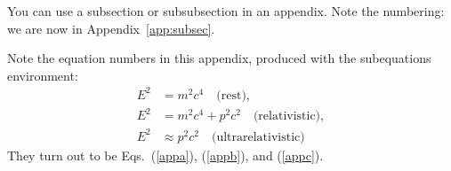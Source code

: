 \documentclass[]{article}
\begin{document}
You can use a subsection or subsubsection in an appendix. Note the numbering: we are now in Appendix~\ref{app:subsec}.

Note the equation numbers in this appendix, produced with the subequations environment:
\begin{subequations}
\begin{align}
  E^2 &= m^2c^4 \quad \text{(rest)}, \label{appa} \\
  E^2 &= m^2c^4 + p^2 c^2 \quad \text{(relativistic)}, \label{appb} \\
  E^2 &\approx p^2 c^2 \quad \text{(ultrarelativistic)} \label{appc}
\end{align}
\end{subequations}
They turn out to be Eqs.~(\ref{appa}), (\ref{appb}), and (\ref{appc}).
\end{document}
